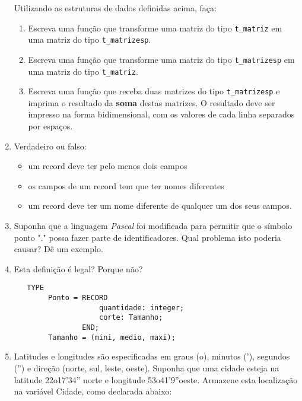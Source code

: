 \begin{enumerate}
Utilizando as estruturas de dados definidas acima, faça:
\begin {enumerate}

\item  Escreva uma função que transforme uma matriz do tipo
\verb|t_matriz| em uma matriz do tipo \verb|t_matrizesp|.

\item  Escreva uma função que transforme uma matriz do tipo
\verb|t_matrizesp| em uma matriz do tipo \verb|t_matriz|.
 
\item  Escreva uma função que receba duas matrizes do tipo 
\verb|t_matrizesp| e imprima o resultado da \textbf{soma} destas matrizes. O
resultado deve ser impresso na forma bidimensional, com os valores de cada
linha separados por espaços.

\end{enumerate}

\item Verdadeiro ou falso: 
\begin{itemize}
   \item  um record deve ter pelo menos dois campos
   \item  os campos de um record tem que ter nomes diferentes
   \item  um record deve ter um nome diferente de qualquer um dos seus campos.
\end{itemize}

\item Suponha que a linguagem \emph{Pascal} foi modificada para permitir que o 
   símbolo ponto "." possa fazer parte de identificadores. Qual problema
   isto poderia causar? Dê um exemplo.

\item Esta definição é legal? Porque não? 

\begin{verbatim}
   TYPE 
        Ponto = RECORD
                    quantidade: integer;
                    corte: Tamanho;
                END;
        Tamanho = (mini, medio, maxi);
\end{verbatim}

\item 
 Latitudes e  longitudes são especificadas em graus  (o), minutos ('),
   segundos ('') e direção (norte, sul, leste, oeste). Suponha que uma
   cidade   esteja   na    latitude   22o17'34''   norte   e   longitude
   53o41'9''oeste.  Armazene esta localização  na variável  Cidade, como
   declarada abaixo:
    

\end{enumerate}

